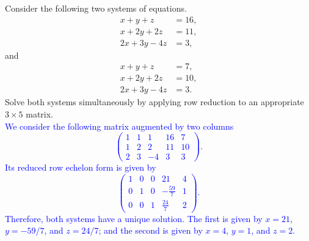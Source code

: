 \documentclass[a4paper,11pt]{article}
\newcommand{\BB}[1]{\textcolor{blue}{#1}}
\begin{document}
 Consider the following two systems of
equations.
\begin{align*}
  x+y+z &= 16, \\
  x+2y+2z &= 11, \\
  2x+3y-4z &= 3,
\end{align*}
and
\begin{align*}
  x+y+z &= 7, \\
  x+2y+2z &= 10, \\
  2x+3y-4z &= 3.
\end{align*}
Solve both systems simultaneously by applying row reduction to an appropriate $3
\times 5$ matrix. \\

\BB{We consider the following matrix augmented by two columns
  \[
    \left(
      \begin{array}{rrr|rr}
        1 & 1 & 1 & 16 & 7 \\
        1 & 2 & 2 & 11 & 10 \\
        2 & 3 & -4 & 3 & 3
      \end{array}
    \right).
  \]
  Its reduced row echelon form is given by
  \[
    \left(
      \begin{array}{rrr|rr}
        1 & 0 & 0 & 21 & 4 \\
        0 & 1 & 0 & -\frac{59}{7} & 1 \\
        0 & 0 & 1 & \frac{24}{7} & 2
      \end{array}
    \right).
  \]
  Therefore, both systems have a unique solution. The first is given by $x=21$,
  $y=-59/7$, and $z=24/7$; and the second is given by $x=4$, $y=1$, and $z=2$. \\
}
\end{document}
